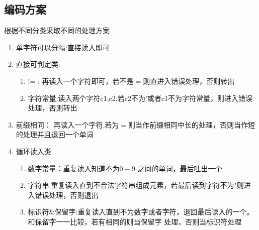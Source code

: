 \documentclass{ctexart}
\begin{document}
	\subsection{编码方案}
	根据不同分类采取不同的处理方案
	\begin{enumerate}
		\item 单字符可以分隔:直接读入即可
		\item 直接可判定类:
		\begin{enumerate}
			\item != : 再读入一个字符即可，若不是$=$则直进入错误处理，否则转出
			\item 字符常量:读入两个字符c1,c2,若c2不为'或者c1不为字符常量，则进入错误处理，否则转出
		\end{enumerate}
		\item 前缀相同： 再读入一个字符,若为$=$则当作前缀相同中长的处理，否则当作短的处理并且退回一个单词
		\item 循环读入类 
		\begin{enumerate}
			\item 数字常量：重复读入知道不为$0-9$ 之间的单词，最后吐出一个
			\item 字符串:重复读入直到不合法字符串组成元素，若最后读到字符不为"则进入错误处理，否则退出
			\item 标识符\&保留字:重复读入直到不为数字或者字符，退回最后读入的一个。和保留字一一比较，若有相同的则当保留字
			处理，否则当标识符处理
		\end{enumerate}
	\end{enumerate}
\newpage
\end{document}
